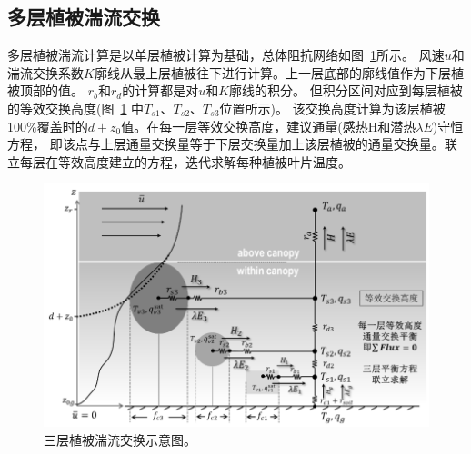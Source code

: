 \subsection{多层植被湍流交换}
多层植被湍流计算是以单层植被计算为基础，总体阻抗网络如图~\ref{fig:三层植被湍流交换示意图}所示。
风速$u$和湍流交换系数$K$廓线从最上层植被往下进行计算。上一层底部的廓线值作为下层植被顶部的值。
$r_b$和$r_d$的计算都是对$u$和$K$廓线的积分。
但积分区间对应到每层植被的等效交换高度(图~\ref{fig:三层植被湍流交换示意图} 中$T_{s1}$、$T_{s2}$、$T_{s3}$位置所示)。
该交换高度计算为该层植被100\%覆盖时的$d+z_0$值。在每一层等效交换高度，建议通量(感热H和潜热$\lambda E$)守恒方程，
即该点与上层通量交换量等于下层交换量加上该层植被的通量交换量。联立每层在等效高度建立的方程，迭代求解每种植被叶片温度。
{
\begin{figure}[]
\centering
\includegraphics{Figures/地表湍流交换过程/三层植被湍流交换示意图.png}
\caption{三层植被湍流交换示意图。}
\label{fig:三层植被湍流交换示意图}
\end{figure}
}


